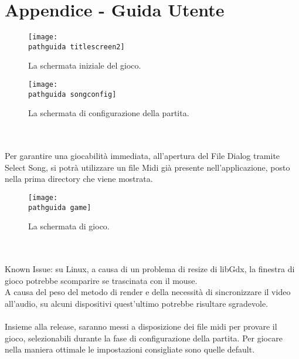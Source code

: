 \documentclass[a4paper,12pt]{report}
\newcommand\pathguida{img/guidautente/}
\begin{document}
\chapter{Appendice - Guida Utente}
\begin{figure}[!htb]
	\centerline{\texttt{[image: \\pathguida titlescreen2]}}
	\caption{La schermata iniziale del gioco.}
	\label{img:title}
\end{figure}
\clearpage \hfill\break
\begin{figure}[!htb]
	\centerline{\texttt{[image: \\pathguida songconfig]}}
	\caption{La schermata di configurazione della partita.}
	\label{img:select}
\end{figure} \\ \\
Per garantire una giocabilità immediata, all'apertura del File Dialog tramite Select Song, si potrà utilizzare un file Midi già presente nell'applicazione, posto nella prima directory che viene mostrata.
\clearpage \hfill\break
\begin{figure}[!htb]
	\centerline{\texttt{[image: \\pathguida game]}}
	\caption{La schermata di gioco.}
	\label{img:game}
\end{figure} \\ \\
Known Issue: su Linux, a causa di un problema di resize di libGdx, la finestra di gioco potrebbe scomparire se trascinata con il mouse. \\ A causa del peso del metodo di render e della necessità di sincronizzare il video all'audio, su alcuni dispositivi quest'ultimo potrebbe risultare sgradevole. \\ \\ Insieme alla release, saranno messi a disposizione dei file midi per provare il gioco, selezionabili durante la fase di configurazione della partita. Per giocare nella maniera ottimale le impostazioni consigliate sono quelle default. 
\end{document}
